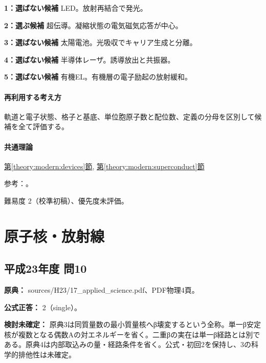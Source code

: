 \noindent\textbf{1：選ばない候補} LED。放射再結合で発光。\par

\noindent\textbf{2：選ぶ候補} 超伝導。凝縮状態の電気磁気応答が中心。\par

\noindent\textbf{3：選ばない候補} 太陽電池。光吸収でキャリア生成と分離。\par

\noindent\textbf{4：選ばない候補} 半導体レーザ。誘導放出と共振器。\par

\noindent\textbf{5：選ばない候補} 有機EL。有機層の電子励起の放射緩和。\par

\paragraph{再利用する考え方} 軌道と電子状態、格子と基底、単位胞原子数と配位数、定義の分母を区別して候補を全て評価する。

\paragraph{共通理論} \hyperref[theory:modern:devices]{第\ref*{theory:modern:devices}節}, \hyperref[theory:modern:superconduct]{第\ref*{theory:modern:superconduct}節}

\par 参考：\cite{modern_pv,modern_led,modern_oled,modern_laser,modern_superconduct}。

\par 難易度 2（校準初稿）、優先度未評価。

\section{原子核・放射線}

\subsection{平成23年度 問10}
\label{q:h23-reg-applied-10}

\noindent\textbf{原典：} sources/H23/17\_applied\_science.pdf、PDF物理4頁。

\textbf{公式正答：} 2（single）。

\par\textbf{検討未確定：} 原典3は同質量数の最小質量核へβ壊変するという全称。単一β安定核が複数となる偶数Aの対エネルギーを省く。二重βの実在は単一β経路とは別である。原典4は内部取込みの量・経路条件を省く。公式・初回2を保持し、3の科学的排他性は未確定。

